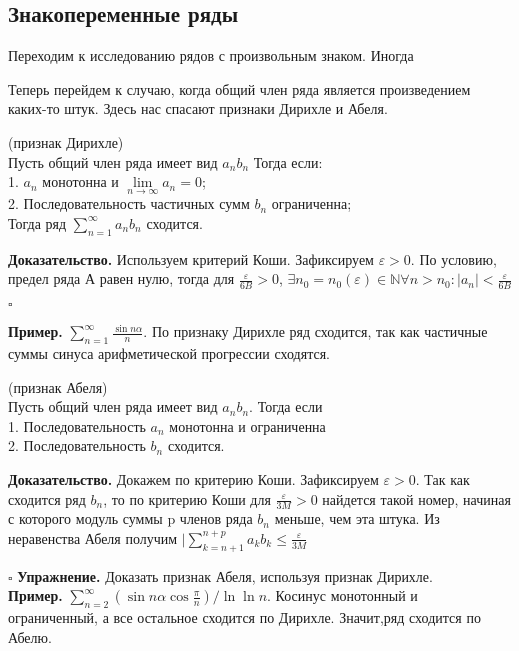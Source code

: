 \subsection{Знакопеременные ряды}
Переходим к исследованию рядов с произвольным знаком. Иногда 

Теперь перейдем к случаю, когда общий член ряда является произведением 
каких-то штук. Здесь нас спасают признаки Дирихле и Абеля.
\begin{theor} (признак Дирихле)\\
Пусть общий член ряда имеет вид $a_nb_n$
Тогда если:\\
1. $a_n$ монотонна и $\lim\limits_{n \to \infty} a_n=0$;\\
2. Последовательность частичных сумм $b_n$ ограниченна;\\
Тогда ряд $\sum\limits_{n=1}^{\infty} a_nb_n$ сходится.
\end{theor}
\textbf{Доказательство.} Используем критерий Коши. 
Зафиксируем $\varepsilon>0$.
По условию, предел ряда А равен нулю, тогда для $\frac{\varepsilon}{6B}>0$,
$\exists n_0=n_0(\varepsilon)\in\mathbb{N}\forall n>n_0:
|a_n|<\frac{\varepsilon}{6B}$ 


$\square$ 

\textbf{Пример.} $\sum\limits_{n=1}^{\infty} \frac{\sin{n\alpha}}{n}$. 
По признаку Дирихле ряд сходится, так как частичные суммы синуса 
арифметической прогрессии сходятся.

\begin{theor}
    (признак Абеля)\\
    Пусть общий член ряда имеет вид $a_nb_n$. Тогда если \\
    1. Последовательность  $a_n$ монотонна и ограниченна\\
    2. Последовательность  $b_n$ сходится.
\end{theor}
\textbf{Доказательство.}  Докажем по критерию Коши. Зафиксируем 
$\varepsilon>0$. Так как сходится ряд $b_n$, то по критерию Коши для 
 $\frac{\varepsilon}{3M}>0$ найдется такой номер, начиная с которого модуль
 суммы p членов ряда $b_n$ меньше, чем эта штука. Из неравенства Абеля получим
$|\sum\limits_{k=n+1}^{n+p} a_k b_k\leqslant \frac{\varepsilon}{3M}$

$\square$ 
\textbf{Упражнение.} Доказать признак Абеля, используя признак Дирихле. \\
\textbf{Пример.} $\sum\limits_{n=2}^{\infty} (\sin{n\alpha}
\cos{\frac{\pi}{n}})/\ln{\ln{n}}$. Косинус монотонный и ограниченный, 
а все остальное сходится по Дирихле. Значит,ряд сходится по Абелю.\\






